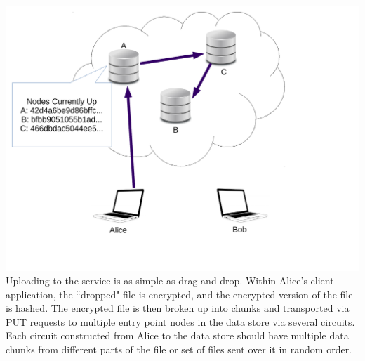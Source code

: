 \begin{center}
    \includegraphics[scale=0.35]{figs/upload.pdf}
    \\
    \small{Uploading to the service is as simple as drag-and-drop. Within Alice's client application, the ``dropped" file
    is encrypted, and the encrypted version of the file is hashed. The encrypted file is then broken up into chunks and
    transported via PUT requests to multiple entry point nodes in the data store via several circuits.
    Each circuit constructed from Alice to
    the data store should have multiple data chunks from different parts of the file or set of files sent over it in random
    order.}
    \\
\end{center}

